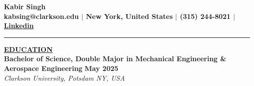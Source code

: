 \documentclass{article}
\begin{document}
\begin{center}
\thispagestyle{empty}
\large \textbf{Kabir Singh \\}
\normalsize \textbf{kabsing@clarkson.edu $\mid$ New York, United States $\mid$ (315) 244-8021 $\mid$  \href{https://www.linkedin.com/in/kabir-singh-a862b7235}{Linkedin} \\}
\rule{\textwidth}{1pt}
\end{center}








\noindent \textbf{\underline{EDUCATION}} \\
\textbf{Bachelor of Science, Double Major in Mechanical Engineering \& Aerospace Engineering} \hfill \textbf{May 2025} \\
\textit{Clarkson University, Potsdam NY, USA} \\
\begin{itemize}[noitemsep,nolistsep,leftmargin=*]
\end{itemize}


% 
%
\end{document}
